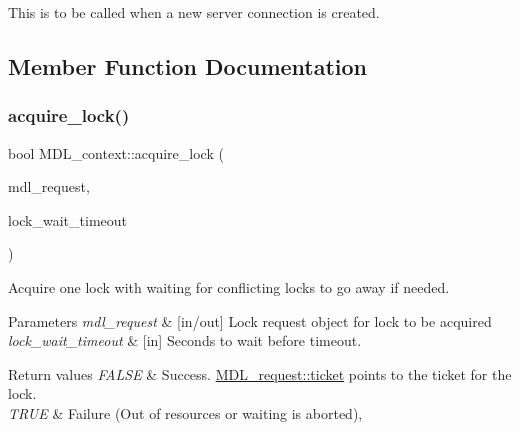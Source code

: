 This is to be called when a new server connection is created. 

\subsection{Member Function Documentation}
\mbox{\label{classMDL__context_a3702152de7ebdf6e2c54e5ba5cbecfda}} 
\subsubsection{\texorpdfstring{acquire\+\_\+lock()}{acquire\_lock()}}
{\footnotesize\ttfamily bool M\+D\+L\+\_\+context\+::acquire\+\_\+lock (\begin{DoxyParamCaption}\item[{\mbox{\hyperlink{classMDL__request}{M\+D\+L\+\_\+request}} $\ast$}]{mdl\+\_\+request,  }\item[{ulong}]{lock\+\_\+wait\+\_\+timeout }\end{DoxyParamCaption})}

Acquire one lock with waiting for conflicting locks to go away if needed.


\begin{DoxyParams}{Parameters}
{\em mdl\+\_\+request} & \mbox{[}in/out\mbox{]} Lock request object for lock to be acquired\\
\hline
{\em lock\+\_\+wait\+\_\+timeout} & \mbox{[}in\mbox{]} Seconds to wait before timeout.\\
\hline
\end{DoxyParams}

\begin{DoxyRetVals}{Return values}
{\em F\+A\+L\+SE} & Success. \mbox{\hyperlink{classMDL__request_a99421002fe2ea1580766846c0ef339ae}{M\+D\+L\+\_\+request\+::ticket}} points to the ticket for the lock. \\
\hline
{\em T\+R\+UE} & Failure (Out of resources or waiting is aborted), \\
\hline
\end{DoxyRetVals}
\mbox{\label{classMDL__context_a4583e611d097158c5f08b8d1133fbd7e}} 

